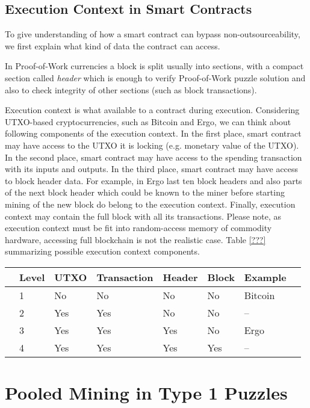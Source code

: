 \documentclass[11pt]{article}
\begin{document}
\subsection{Execution Context in Smart Contracts}

To give understanding of how a smart contract can bypass non-outsourceability, we first explain what kind of data the contract
can access.

In Proof-of-Work currencies a block is split usually into sections, with a compact section called {\em header} which is
enough to verify Proof-of-Work puzzle solution and also to check integrity of other sections (such as block transactions).

Execution context is what available to a contract during execution. Considering UTXO-based cryptocurrencies, such as
Bitcoin and Ergo, we can think about following components of the execution context. In the first place, smart contract
 may have access to the UTXO it is locking (e.g. monetary value of the UTXO). In the second place, smart contract may
 have access to the spending transaction with its inputs and outputs. In the third place, smart contract may have access
 to block header data. For example, in Ergo last ten block headers and also parts of the next block header which could
 be known to the miner before starting mining of the new block do belong to the execution context. Finally, execution
 context may contain the full block with all its transactions. Please note, as execution context must be fit into
 random-access memory of commodity hardware, accessing full blockchain is not the realistic case. Table \ref{???}
 summarizing possible execution context components.


\begin{tabular}{llllllll}
	& Level & UTXO & Transaction & Header      & Block & Example \\ \hline
	& 1     & No  & No          & No  		   & No    & Bitcoin \\
	& 2     & Yes & Yes         & No 		   & No    & -- \\
	& 3     & Yes & Yes         & Yes 		   & No    & Ergo    \\
	& 4     & Yes & Yes         & Yes 		   & Yes   & --    \\
\end{tabular}
	
\section{Pooled Mining in Type 1 Puzzles}
\end{document}
